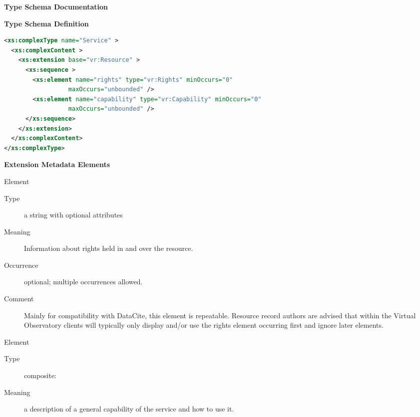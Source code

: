 \documentclass[11pt,a4paper]{ivoa}
\begin{document}
\begin{generated}
\begingroup
      	\renewcommand*\descriptionlabel[1]{%
      	\hbox to 5.5em{\emph{#1}\hfil}}\vspace{2ex}\noindent\textbf{ Type Schema Documentation}


\vspace{1ex}\noindent\textbf{ Type Schema Definition}

\begin{lstlisting}[language=XML,basicstyle=\footnotesize]
<xs:complexType name="Service" >
  <xs:complexContent >
    <xs:extension base="vr:Resource" >
      <xs:sequence >
        <xs:element name="rights" type="vr:Rights" minOccurs="0"
                  maxOccurs="unbounded" />
        <xs:element name="capability" type="vr:Capability" minOccurs="0"
                  maxOccurs="unbounded" />
      </xs:sequence>
    </xs:extension>
  </xs:complexContent>
</xs:complexType>
\end{lstlisting}

\vspace{0.5ex}\noindent\textbf{ Extension Metadata Elements}

\begingroup\small\begin{bigdescription}\item[Element \xmlel{rights}]
\begin{description}
\item[Type] a string with optional attributes
\item[Meaning] 
                       Information about rights held in and over the resource.
                     
\item[Occurrence] optional; multiple occurrences allowed.
\item[Comment] 
                       Mainly for compatibility with DataCite, this element
                       is repeatable.  Resource record authors are advised
                       that within the Virtual Observatory clients will
                       typically only display and/or use the rights
                       element occurring first and ignore later elements.
                     

\end{description}
\item[Element \xmlel{capability}]
\begin{description}
\item[Type] composite: 
\item[Meaning] 
                        a description of a general capability of the
                        service and how to use it.
                     

\end{description}
\end{bigdescription}
\end{generated}
\end{document}
